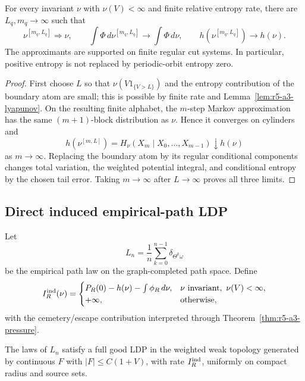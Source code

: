 \begin{lemma}
\label{lem:r5-a3-entropy}
For every invariant \(\nu\) with \(\nu(V)<\infty\) and finite relative
entropy rate, there are \(L_q,m_q\to\infty\) such that
\[
 \nu^{[m_q,L_q]}\Longrightarrow\nu,\qquad
 \int\Phi\,d\nu^{[m_q,L_q]}\to\int\Phi\,d\nu,
 \qquad
 h(\nu^{[m_q,L_q]})\to h(\nu).
\]
The approximants are supported on finite regular cut systems.  In particular,
positive entropy is not replaced by periodic-orbit entropy zero.
\end{lemma}

\begin{proof}
First choose \(L\) so that
\(\nu(V1_{\{V>L\}})\) and the entropy contribution of the boundary atom are
small; this is possible by finite rate and
Lemma~\ref{lem:r5-a3-lyapunov}.  On the resulting finite alphabet, the
\(m\)-step Markov approximation has the same \((m+1)\)-block distribution as
\(\nu\).  Hence it converges on cylinders and
\[
 h(\nu^{[m,L]})
 =H_\nu(X_m\mid X_0,\ldots,X_{m-1})
 \downarrow h(\nu)
\]
as \(m\to\infty\).  Replacing the boundary atom by its regular conditional
components changes total variation, the weighted potential integral, and
conditional entropy by the chosen tail error.  Taking \(m\to\infty\) after
\(L\to\infty\) proves all three limits.
\end{proof}

\subsection{Direct induced empirical-path LDP}

Let
\[
 L_n=\frac1n\sum_{k=0}^{n-1}\delta_{\Theta^k\omega}
\]
be the empirical path law on the graph-completed path space.  Define
\[
 I_R^{\rm ind}(\nu)
 =
 \begin{cases}
 P_R(0)-h(\nu)-\int\phi_R\,d\nu,&
 \nu\text{ invariant},\ \nu(V)<\infty,\\
 +\infty,&\text{otherwise},
 \end{cases}
\]
with the cemetery/escape contribution interpreted through
Theorem~\ref{thm:r5-a3-pressure}.

\begin{theorem}
\label{thm:r5-a3-induced}
The laws of \(L_n\) satisfy a full good LDP in the weighted weak topology
generated by continuous \(F\) with \(|F|\le C(1+V)\), with rate
\(I_R^{\rm ind}\), uniformly on compact radius and source sets.
\end{theorem}

